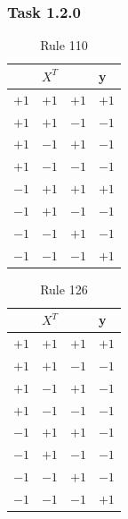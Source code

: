 \documentclass[10pt,aspectratio=169,handout]{beamer}
\begin{document}
\begin{frame}
    \frametitle{Task 1.2.0}
    \begin{minipage}{0.45\textwidth}
        \begin{table}[]
            \caption[short]{Rule 110}
            \begin{tabular}{llll}
                \hline
                     & $X^T$ &      & y    \\ \hline
                $+1$ & $+1$  & $+1$ & $+1$ \\
                $+1$ & $+1$  & $-1$ & $-1$ \\
                $+1$ & $-1$  & $+1$ & $-1$ \\
                $+1$ & $-1$  & $-1$ & $-1$ \\
                $-1$ & $+1$  & $+1$ & $+1$ \\
                $-1$ & $+1$  & $-1$ & $-1$ \\
                $-1$ & $-1$  & $+1$ & $-1$ \\
                $-1$ & $-1$  & $-1$ & $+1$ \\ \hline
            \end{tabular}
        \end{table}
    \end{minipage}
    \begin{minipage}{0.45\textwidth}
        \begin{table}[]
            \caption[short]{Rule 126}
            \begin{tabular}{llll}
                \hline
                     & $X^T$ &      & y    \\ \hline
                $+1$ & $+1$  & $+1$ & $+1$ \\
                $+1$ & $+1$  & $-1$ & $-1$ \\
                $+1$ & $-1$  & $+1$ & $-1$ \\
                $+1$ & $-1$  & $-1$ & $-1$ \\
                $-1$ & $+1$  & $+1$ & $-1$ \\
                $-1$ & $+1$  & $-1$ & $-1$ \\
                $-1$ & $-1$  & $+1$ & $-1$ \\
                $-1$ & $-1$  & $-1$ & $+1$ \\ \hline
            \end{tabular}
        \end{table}
    \end{minipage}
\end{frame}
\end{document}
